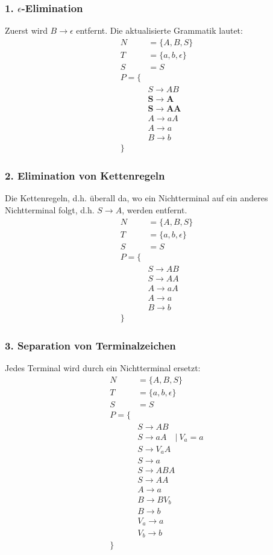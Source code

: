 \subsubsection{1. $\epsilon$-Elimination}
Zuerst wird $B\to \epsilon$ entfernt. Die aktualisierte Grammatik lautet:
\begin{align*}
    N&=\{A,B,S\}\\
    T&=\{a,b,\epsilon\}\\
    S&=S\\
    P=\{\\
    &S\to AB\\
    &\mathbf{S\to A}\\
    &\mathbf{S\to AA}\\
    &A\to aA\\
    &A\to a\\
    &B\to b\\
    \}
\end{align*}
\subsubsection{2. Elimination von Kettenregeln}
Die Kettenregeln, d.h. überall da, wo ein Nichtterminal auf ein anderes Nichtterminal folgt, d.h. $S\to A$, werden entfernt.
\begin{align*}
    N&=\{A,B,S\}\\
    T&=\{a,b,\epsilon\}\\
    S&=S\\
    P=\{\\
    &S\to AB\\
    &S\to AA\\
    &A\to aA\\
    &A\to a\\
    &B\to b\\
    \}
\end{align*}
\subsubsection{3. Separation von Terminalzeichen}
Jedes Terminal wird durch ein Nichtterminal ersetzt:
\begin{align*}
    N&=\{A,B,S\}\\
    T&=\{a,b,\epsilon\}\\
    S&=S\\
    P=\{\\
    &S\to AB\\
    &S\to aA \quad |\ V_a = a\\
    &S\to V_{a}A\\
    &S\to a\\
    &S\to ABA\\
    &S\to AA\\
    &A\to a\\
    &B\to BV_b\\
    &B\to b\\
    &V_a\to a\\
    &V_b\to b\\
    \}
\end{align*}
